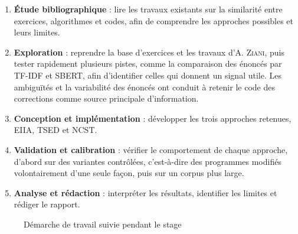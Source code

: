 \documentclass[12pt,a4paper,oneside]{report}
\begin{document}
\begin{enumerate}
    \item \textbf{Étude bibliographique} : lire les travaux existants sur
    la similarité entre exercices, algorithmes et codes, afin de
    comprendre les approches possibles et leurs limites.
    \item \textbf{Exploration} : reprendre la base d'exercices et les
    travaux d'A. \textsc{Ziani}, puis tester rapidement plusieurs pistes,
    comme la comparaison des énoncés par TF-IDF et SBERT, afin d'identifier
    celles qui donnent un signal utile. Les ambiguïtés et la variabilité des
    énoncés ont conduit à retenir le code des corrections comme source
    principale d'information.
    \item \textbf{Conception et implémentation} : développer les trois
    approches retenues, EIIA, TSED et NCST.
    \item \textbf{Validation et calibration} : vérifier le comportement de
    chaque approche, d'abord sur des variantes contrôlées, c'est-à-dire des
    programmes modifiés volontairement d'une seule façon, puis sur un
    corpus plus large.
    \item \textbf{Analyse et rédaction} : interpréter les résultats,
    identifier les limites et rédiger le rapport.
\end{enumerate}

\begin{figure}[H]
    \centering
    \caption{Démarche de travail suivie pendant le stage}
    \label{fig:methodo}
\end{figure}
\end{document}
